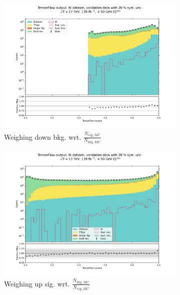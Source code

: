 \documentclass[12pt, a4paper]{book}
\begin{document}
\begin{figure}[!ht]
	\centering
	\begin{subfigure}[b]{0.49\textwidth}
        \centering
        \includegraphics[width=1\textwidth]{bkg_MC/VAL.pdf}
        \caption{Weighing down bkg. wrt. $\frac{N_{sig,MC}}{N_{bkg,MC}}$ }
     \end{subfigure}
     \hfill
     \begin{subfigure}[b]{0.49\textwidth}
        \centering
        \includegraphics[width=1\textwidth]{sig_MC/VAL.pdf}
        \caption{Weighing up sig. wrt. $\frac{N_{bkg,MC}}{N_{sig,MC}}$}
     \end{subfigure}
     \hfill
     \begin{subfigure}[b]{0.49\textwidth}
          \centering

\end{subfigure}
\end{figure}
\end{document}
